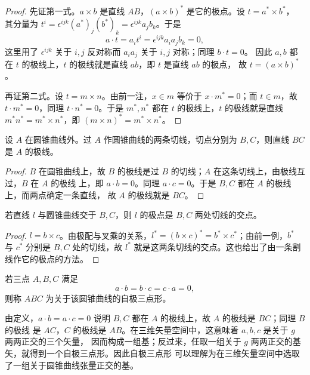 \begin{proof}
先证第一式。$a\times b$ 是直线 $AB$，$(a\times b)^*$ 是它的极点。设 $t=a^*\times b^*$，
其分量为 $t^i=\epsilon^{ijk}(a^*)_j(b^*)_k=\epsilon^{ijk}a_jb_k$。于是
\[
a\cdot t=a_it^i=\epsilon^{ijk}a_ia_jb_k=0,
\]
这里用了 $\epsilon^{ijk}$ 关于 $i,j$ 反对称而 $a_ia_j$ 关于 $i,j$ 对称；同理 $b\cdot t=0$。
因此 $a,b$ 都在 $t$ 的极线上，$t$ 的极线就是直线 $ab$，即 $t$ 是直线 $ab$ 的极点，
故 $t=(a\times b)^*$。

再证第二式。设 $t=m\times n$。由前一注，$x\in m$ 等价于 $x\cdot m^*=0$；而 $t\in m$，故
$t\cdot m^*=0$，同理 $t\cdot n^*=0$。于是 $m^*,n^*$ 都在 $t$ 的极线上，$t$ 的极线就是直线
$m^*n^*=m^*\times n^*$，即 $(m\times n)^*=m^*\times n^*$。
\end{proof}

\begin{example}[外点的极线]
设 $A$ 在圆锥曲线外。过 $A$ 作圆锥曲线的两条切线，切点分别为 $B,C$，则直线 $BC$ 是 $A$ 的极线。
\end{example}

\begin{proof}
$B$ 在圆锥曲线上，故 $B$ 的极线是过 $B$ 的切线；$A$ 在这条切线上，由极线互过，$B$ 在 $A$ 的极线
上，即 $a\cdot b=0$。同理 $a\cdot c=0$。于是 $B,C$ 都在 $A$ 的极线上，而两点确定一条直线，
故 $A$ 的极线就是 $BC$。
\end{proof}

\begin{corollary}
若直线 $l$ 与圆锥曲线交于 $B,C$，则 $l$ 的极点是 $B,C$ 两处切线的交点。
\end{corollary}

\begin{proof}
$l=b\times c$。由极配与叉乘的关系，$l^*=(b\times c)^*=b^*\times c^*$；由前一例，$b^*$ 与 $c^*$
分别是 $B,C$ 处的切线，故 $l^*$ 就是这两条切线的交点。这也给出了由一条割线作它的极点的方法。
\end{proof}

\begin{definition}[自极三点形]
若三点 $A,B,C$ 满足
\[
a\cdot b=b\cdot c=c\cdot a=0,
\]
则称 $ABC$ 为关于该圆锥曲线的自极三点形。
\end{definition}

\begin{remark}
由定义，$a\cdot b=a\cdot c=0$ 说明 $B,C$ 都在 $A$ 的极线上，故 $A$ 的极线是 $BC$；同理 $B$ 的极线
是 $AC$，$C$ 的极线是 $AB$。在三维矢量空间中，这意味着 $a,b,c$ 是关于 $g$ 两两正交的三个矢量，
因而构成一组基；反过来，任取一组关于 $g$ 两两正交的基矢，就得到一个自极三点形。因此自极三点形
可以理解为在三维矢量空间中选取了一组关于圆锥曲线张量正交的基。
\end{remark}

